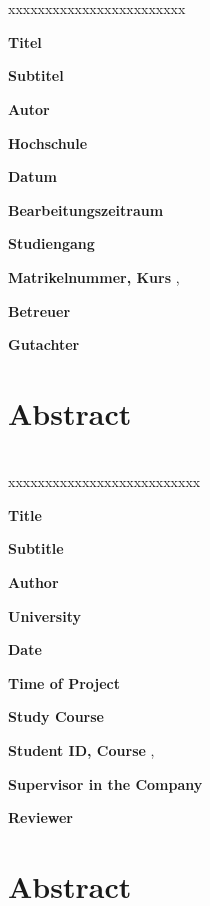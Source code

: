 \section*{\reporttype}

\begin{xlist}{xxxxxxxxxxxxxxxxxxxxxxxx} 
  		\item[\textbf{Titel}]        			\reporttitle
		\item[\textbf{Subtitel}]          		\reportsubtitle
		\item[\textbf{Autor}]          			\student
		\item[\textbf{Hochschule}]          	\dhbw
		\item[\textbf{Datum}]          			\handoverdate
		\item[\textbf{Bearbeitungszeitraum}] 	\timerange
		\item[\textbf{Studiengang}]          	\studiengang
		\item[\textbf{Matrikelnummer, Kurs}]  	\matrikel, \kurs
		\item[\textbf{Betreuer}]   				\tutor
		\item[\textbf{Gutachter}]            	\prof
\end{xlist}
 	
\section*{Abstract}


\clearpage

\section*{\reporttype}

\begin{xlist}{xxxxxxxxxxxxxxxxxxxxxxxxxx} 
  		\item[\textbf{Title}]        			 	\reporttitle
		\item[\textbf{Subtitle}]          		 	\reportsubtitle
		\item[\textbf{Author}]          		 	\student
		\item[\textbf{University}]          	 	\dhbw
		\item[\textbf{Date}]          		 	   	\handoverdate
		\item[\textbf{Time of Project}]             \timerange
		\item[\textbf{Study Course}]          	 	\studiengang
		\item[\textbf{Student ID, Course}]  		\matrikel, \kurs
		\item[\textbf{Supervisor in the Company}]   \tutor
		\item[\textbf{Reviewer}]            		\prof
\end{xlist}
 	
\section*{Abstract}
